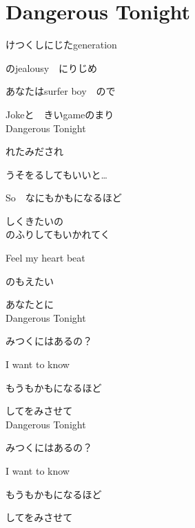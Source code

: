 \section{ Dangerous Tonight}
\large{

けつくしにじたgeneration

のjealousy　にりじめ

あなたはsurfer boy　ので

Jokeと　きいgameのまり
\\

Dangerous Tonight

れたみだされ

うそをるしてもいいと…

So　なにもかもになるほど

しくきたいの
\\

のふりしてもいかれてく

Feel my heart beat

のもえたい

あなたとに
\\

Dangerous Tonight

みつくにはあるの？

I want to know

もうもかもになるほど

してをみさせて
\\

Dangerous Tonight

みつくにはあるの？

I want to know

もうもかもになるほど

してをみさせて

}